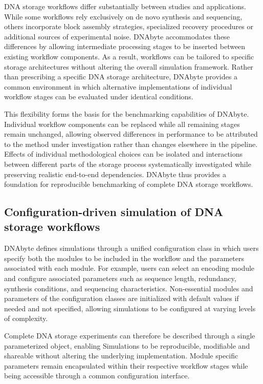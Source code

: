 \documentclass[pdflatex,sn-mathphys-num]{sn-jnl}%
\theoremstyle{thmstyleone}%
\theoremstyle{thmstyletwo}%
\theoremstyle{thmstylethree}%
\begin{document}
DNA storage workflows differ substantially between studies and applications. While some workflows rely exclusively on de novo synthesis and sequencing, others incorporate block assembly strategies, specialized recovery procedures or additional sources of experimental noise. DNAbyte accommodates these differences by allowing intermediate processing stages to be inserted between existing workflow components. As a result, workflows can be tailored to specific storage architectures without altering the overall simulation framework. Rather than prescribing a specific DNA storage architecture, DNAbyte provides a common environment in which alternative implementations of individual workflow stages can be evaluated under identical conditions.

This flexibility forms the basis for the benchmarking capabilities of DNAbyte. Individual workflow components can be replaced while all remaining stages remain unchanged, allowing observed differences in performance to be attributed to the method under investigation rather than changes elsewhere in the pipeline. Effects of individual methodological choices can be isolated and interactions between different parts of the storage process systematically investigated while preserving realistic end-to-end dependencies. DNAbyte thus provides a foundation for reproducible benchmarking of complete DNA storage workflows.

\subsection{Configuration-driven simulation of DNA storage workflows}
DNAbyte defines simulations through a unified configuration class in which users specify both the modules to be included in the workflow and the parameters associated with each module. For example, users can select an encoding module and configure associated parameters such as sequence length, redundancy, synthesis conditions, and sequencing characteristics. Non-essential modules and parameters of the configuration classes are initialized with default values if needed and not specified, allowing simulations to be configured at varying levels of complexity.

Complete DNA storage experiments can therefore be described through a single parameterized object, enabling Simulations to be reproducible, modifiable and shareable without altering the underlying implementation. Module specific parameters remain encapsulated within their respective workflow stages while being accessible through a common configuration interface.
\end{document}
